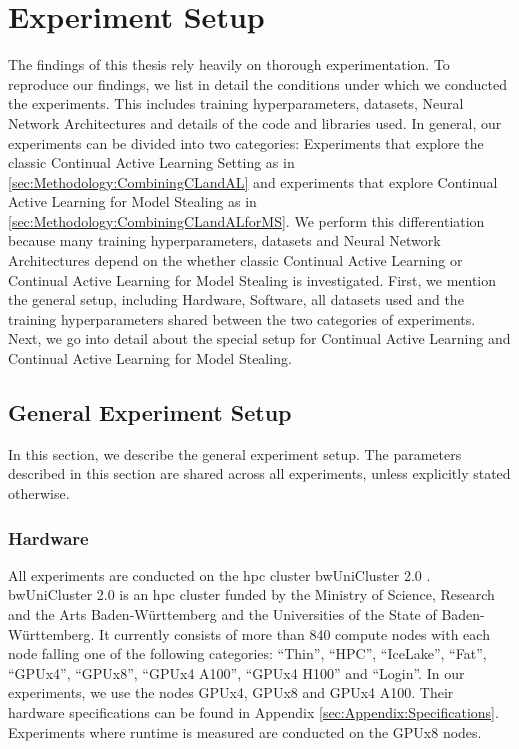 
\chapter{Experiment Setup}
\label{ch:ExperimentSetup}
The findings of this thesis rely heavily on thorough experimentation. To reproduce our findings, we list in detail the
conditions under which we conducted the experiments. This includes training hyperparameters, datasets, Neural Network Architectures
and details of the code and libraries used. In general, our experiments can be divided into two categories: Experiments that explore
the classic Continual Active Learning Setting as in \ref{sec:Methodology:CombiningCLandAL} and experiments that explore Continual 
Active Learning for Model Stealing as in \ref{sec:Methodology:CombiningCLandALforMS}. We perform this differentiation because many 
training hyperparameters, datasets and Neural Network Architectures depend on the whether classic Continual Active Learning or Continual 
Active Learning for Model Stealing is investigated. First, we mention the general setup, including Hardware, Software, all datasets used
and the training hyperparameters shared between the two categories of experiments. Next, we go into detail about the special setup for
Continual Active Learning and Continual Active Learning for Model Stealing.

\section{General Experiment Setup}
\label{sec:ExperimentSetup:FirstSection}
In this section, we describe the general experiment setup. The parameters described in this section are shared across all experiments, unless
explicitly stated otherwise.

\subsection{Hardware}
\label{sec:ExperimentSetup:Hardware}
All experiments are conducted on the \gls{hpc} cluster bwUniCluster 2.0 \cite{bwUnicluster}. bwUniCluster 2.0 is an \gls{hpc} cluster
funded by the Ministry of Science, Research and the Arts Baden-Württemberg and the Universities of the State of Baden-Württemberg. It currently consists
of more than 840 compute nodes with each node falling one of the following categories: \enquote{Thin}, \enquote{HPC}, \enquote{IceLake}, \enquote{Fat},
\enquote{GPUx4}, \enquote{GPUx8}, \enquote{GPUx4 A100}, \enquote{GPUx4 H100} and \enquote{Login}. In our experiments, we use the nodes GPUx4, GPUx8 and
GPUx4 A100. Their hardware specifications can be found in Appendix \ref{sec:Appendix:Specifications}. Experiments where runtime is measured are
conducted on the GPUx8 nodes.

